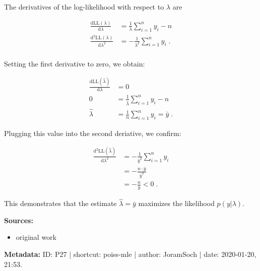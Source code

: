 \documentclass[a4paper,12pt,twoside]{book}
\begin{document}
The derivatives of the log-likelihood with respect to $\lambda$ are

\begin{equation} \label{eq:poiss-mle-Poiss-dLLdl-d2LLdl2}
\begin{split}
\frac{\mathrm{d}\mathrm{LL}(\lambda)}{\mathrm{d}\lambda} &= \frac{1}{\lambda} \sum_{i=1}^n y_i - n \\
\frac{\mathrm{d}^2\mathrm{LL}(\lambda)}{\mathrm{d}\lambda^2} &= -\frac{1}{\lambda^2} \sum_{i=1}^n y_i \; . \\
\end{split}
\end{equation}

Setting the first derivative to zero, we obtain:

\begin{equation} \label{eq:poiss-mle-Poiss-dLLdl}
\begin{split}
\frac{\mathrm{d}\mathrm{LL}(\hat{\lambda})}{\mathrm{d}\lambda} &= 0 \\
0 &= \frac{1}{\hat{\lambda}} \sum_{i=1}^n y_i - n \\
\hat{\lambda} &= \frac{1}{n} \sum_{i=1}^n y_i = \bar{y} \; .
\end{split}
\end{equation}

Plugging this value into the second deriative, we confirm:

\begin{equation} \label{eq:poiss-mle-Poiss-d2LLdl2}
\begin{split}
\frac{\mathrm{d}^2\mathrm{LL}(\hat{\lambda})}{\mathrm{d}\lambda^2} &= -\frac{1}{\bar{y}^2} \sum_{i=1}^n y_i \\
&= -\frac{n \cdot \bar{y}}{\bar{y}^2} \\
&= -\frac{n}{\bar{y}} < 0 \; .
\end{split}
\end{equation}

This demonstrates that the estimate $\hat{\lambda} = \bar{y}$ maximizes the likelihood $p(y \vert \lambda)$.


\vspace{1em}
\textbf{Sources:}
\begin{itemize}
\item original work\end{itemize}


\vspace{1em}
\textbf{Metadata:} ID: P27 | shortcut: poiss-mle | author: JoramSoch | date: 2020-01-20, 21:53.
\vspace{1em}
\end{document}
